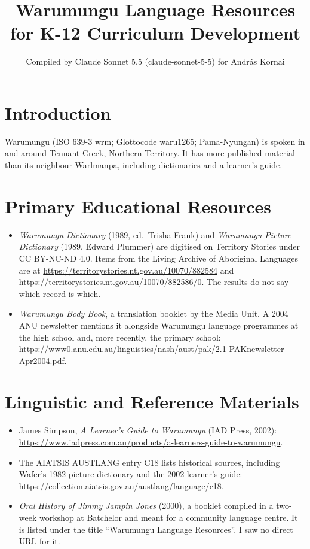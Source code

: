 \documentclass[12pt]{article}
\title{Warumungu Language Resources for K-12 Curriculum Development}
\author{Compiled by Claude Sonnet 5.5 (claude-sonnet-5-5) for Andr\'as Kornai}
\date{}
\begin{document}
\maketitle

\section{Introduction}
Warumungu (ISO 639-3 wrm; Glottocode waru1265; Pama-Nyungan) is spoken in and around Tennant Creek, Northern Territory. It has more published material than its neighbour Warlmanpa, including dictionaries and a learner's guide.

\section{Primary Educational Resources}
\begin{itemize}
\item \emph{Warumungu Dictionary} (1989, ed.\ Trisha Frank) and \emph{Warumungu Picture Dictionary} (1989, Edward Plummer) are digitised on Territory Stories under CC BY-NC-ND 4.0. Items from the Living Archive of Aboriginal Languages are at \url{https://territorystories.nt.gov.au/10070/882584} and \url{https://territorystories.nt.gov.au/10070/882586/0}. The results do not say which record is which.
\item \emph{Warumungu Body Book}, a translation booklet by the Media Unit. A 2004 ANU newsletter mentions it alongside Warumungu language programmes at the high school and, more recently, the primary school: \url{https://www0.anu.edu.au/linguistics/nash/aust/pak/2.1-PAKnewsletter-Apr2004.pdf}.
\end{itemize}

\section{Linguistic and Reference Materials}
\begin{itemize}
\item James Simpson, \emph{A Learner's Guide to Warumungu} (IAD Press, 2002): \url{https://www.iadpress.com.au/products/a-learners-guide-to-warumungu}.
\item The AIATSIS AUSTLANG entry C18 lists historical sources, including Wafer's 1982 picture dictionary and the 2002 learner's guide: \url{https://collection.aiatsis.gov.au/austlang/language/c18}.
\item \emph{Oral History of Jimmy Jampin Jones} (2000), a booklet compiled in a two-week workshop at Batchelor and meant for a community language centre. It is listed under the title ``Warumungu Language Resources''. I saw no direct URL for it.
\end{itemize}
\end{document}
